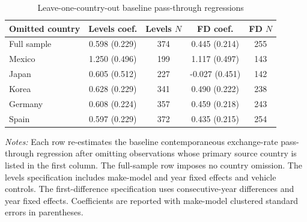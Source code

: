 
\begin{table}[htbp]
\centering
\caption{Leave-one-country-out baseline pass-through regressions}
\label{tab:leave_one_country_out_report}
\begin{tabular}{lcccc}
\toprule
Omitted country & Levels coef. & Levels $N$ & FD coef. & FD $N$ \\
\midrule
Full sample & 0.598 (0.229) & 374 & 0.445 (0.214) & 255 \\
Mexico & 1.250 (0.496) & 199 & 1.117 (0.497) & 143 \\
Japan & 0.605 (0.512) & 227 & -0.027 (0.451) & 142 \\
Korea & 0.628 (0.229) & 341 & 0.490 (0.222) & 238 \\
Germany & 0.608 (0.224) & 357 & 0.459 (0.218) & 243 \\
Spain & 0.597 (0.229) & 372 & 0.435 (0.215) & 254 \\
\bottomrule
\end{tabular}
\vspace{0.25em}
\begin{minipage}{0.96\textwidth}
\footnotesize \textit{Notes:} Each row re-estimates the baseline contemporaneous exchange-rate pass-through regression after omitting observations whose primary source country is listed in the first column. The full-sample row imposes no country omission. The levels specification includes make-model and year fixed effects and vehicle controls. The first-difference specification uses consecutive-year differences and year fixed effects. Coefficients are reported with make-model clustered standard errors in parentheses.
\end{minipage}
\end{table}
